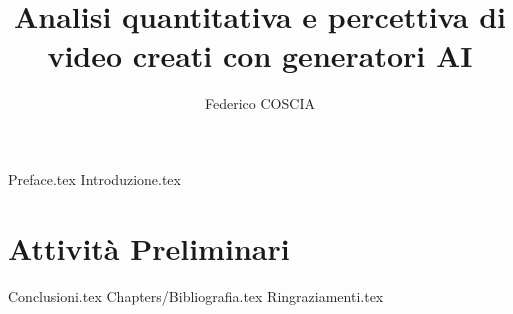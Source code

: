 \documentclass[a4paper,12pt]{report}
\begin{document}
\title{Analisi quantitativa e percettiva di video creati con generatori AI}
\author{Federico COSCIA}

{Preface.tex}
{Introduzione.tex}

\chapter{Attività Preliminari}

{Conclusioni.tex}
 {Chapters/}{Bibliografia.tex}
{Ringraziamenti.tex}
\end{document}
